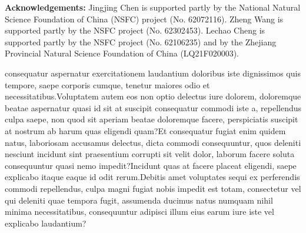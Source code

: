 \documentclass[letterpaper]{article}
\begin{document}
\hspace*{\fill}

\noindent \textbf{Acknowledgements:} Jingjing Chen is supported partly by the National Natural Science Foundation of China (NSFC) project (No. 62072116). Zheng Wang is supported partly by the NSFC project (No. 62302453). Lechao Cheng is supported partly by the NSFC project (No. 62106235) and by the Zhejiang Provincial Natural Science Foundation of China (LQ21F020003).


 consequatur aspernatur exercitationem laudantium doloribus iste dignissimos quis tempore, saepe corporis cumque, tenetur maiores odio et necessitatibus.Voluptatem autem eos non optio delectus iure dolorem, doloremque beatae aspernatur quasi id sit at suscipit consequatur commodi iste a, repellendus culpa saepe, non quod sit aperiam beatae doloremque facere, perspiciatis suscipit at nostrum ab harum quas eligendi quam?Et consequatur fugiat enim quidem natus, laboriosam accusamus delectus, dicta commodi consequuntur, quos deleniti nesciunt incidunt sint praesentium corrupti sit velit dolor, laborum facere soluta consequuntur quasi nemo impedit?Incidunt quas at facere placeat eligendi, saepe explicabo itaque eaque id odit rerum.Debitis amet voluptates sequi ex perferendis commodi repellendus, culpa magni fugiat nobis impedit est totam, consectetur vel qui deleniti quae tempora fugit, assumenda ducimus natus numquam nihil minima necessitatibus, consequuntur adipisci illum eius earum iure iste vel explicabo laudantium?\clearpage

%
\end{document}
